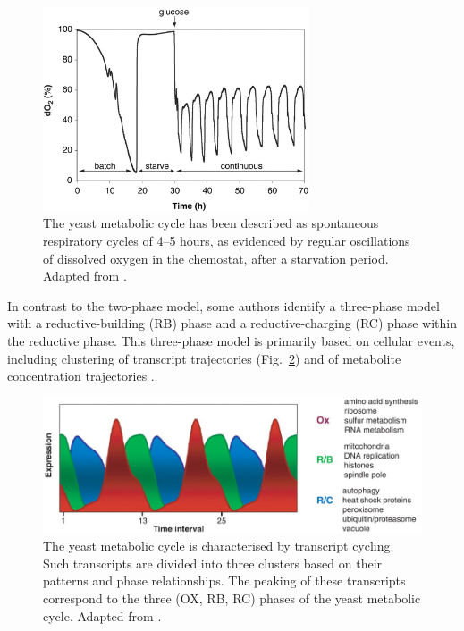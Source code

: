 \begin{figure}[ht!]
  \centering
  \includegraphics[width=0.7\textwidth]{tuLogicYeastMetabolic2005_1}
  \caption[
    The yeast metabolic cycle has been described as spontaneous respiratory cycles
  ]{
    The yeast metabolic cycle has been described as spontaneous respiratory cycles of 4--5 hours, as evidenced by regular oscillations of dissolved oxygen in the chemostat, after a starvation period.
    Adapted from \textcite{tuLogicYeastMetabolic2005}.}
  \label{fig:intro-ymc-tu-oxygen}
\end{figure}

In contrast to the two-phase model, some authors identify a three-phase model with a reductive-building (RB) phase and a reductive-charging (RC) phase within the reductive phase.
This three-phase model is primarily based on cellular events, including clustering of transcript trajectories \parencite{tuLogicYeastMetabolic2005} (Fig.\ \ref{fig:intro-ymc-tu-transcripts}) and of metabolite concentration trajectories \parencite{tuCyclicChangesMetabolic2007}.

\begin{figure}[hb!]
  \centering
  \includegraphics[width=1.0\textwidth]{tuLogicYeastMetabolic2005_3d_adapted}
  \caption[
    The yeast metabolic cycle is characterised by transcript cycling
  ]{
    The yeast metabolic cycle is characterised by transcript cycling.
    Such transcripts are divided into three clusters based on their patterns and phase relationships.
    The peaking of these transcripts correspond to the three (OX, RB, RC) phases of the yeast metabolic cycle.
    Adapted from \textcite{tuLogicYeastMetabolic2005}.}
  \label{fig:intro-ymc-tu-transcripts}
\end{figure}


